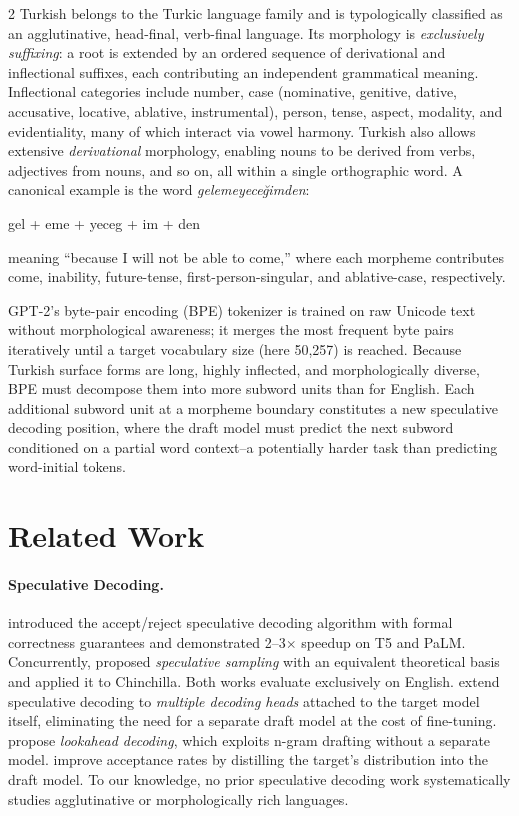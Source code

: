 \documentclass[11pt,a4paper]{article}
\begin{document}
\begin{multicols}{2}
Turkish belongs to the Turkic language family and is typologically
classified as an agglutinative, head-final, verb-final language.
Its morphology is \emph{exclusively suffixing}: a root is extended by
an ordered sequence of derivational and inflectional suffixes, each
contributing an independent grammatical meaning.
Inflectional categories include number, case (nominative, genitive,
dative, accusative, locative, ablative, instrumental), person, tense,
aspect, modality, and evidentiality, many of which interact via
vowel harmony.
Turkish also allows extensive \emph{derivational} morphology, enabling
nouns to be derived from verbs, adjectives from nouns, and so on, all
within a single orthographic word.
A canonical example is the word \textit{gelemeyeceğimden}:
\begin{center}
  \small gel + eme + yeceg + im + den
\end{center}
meaning ``because I will not be able to come,'' where each morpheme
contributes come, inability, future-tense, first-person-singular, and
ablative-case, respectively.

GPT-2's byte-pair encoding (BPE) tokenizer \citep{sennrich2016neural}
is trained on raw Unicode text without morphological awareness; it merges
the most frequent byte pairs iteratively until a target vocabulary size
(here 50,257) is reached.
Because Turkish surface forms are long, highly inflected, and
morphologically diverse, BPE must decompose them into more subword units
than for English.
Each additional subword unit at a morpheme boundary constitutes a new
speculative decoding position, where the draft model must predict the
next subword conditioned on a partial word context--a potentially harder
task than predicting word-initial tokens.

\section{Related Work}
\label{sec:related}

\paragraph{Speculative Decoding.}
\citet{leviathan2023fast} introduced the accept/reject speculative
decoding algorithm with formal correctness guarantees and demonstrated
2--3$\times$ speedup on T5 and PaLM.
Concurrently, \citet{chen2023accelerating} proposed \emph{speculative
sampling} with an equivalent theoretical basis and applied it to
Chinchilla.
Both works evaluate exclusively on English.
\citet{cai2024medusa} extend speculative decoding to \emph{multiple
decoding heads} attached to the target model itself, eliminating the need
for a separate draft model at the cost of fine-tuning.
\citet{fu2024break} propose \emph{lookahead decoding}, which exploits
n-gram drafting without a separate model.
\citet{zhou2024distillspec} improve acceptance rates by distilling the
target's distribution into the draft model.
To our knowledge, no prior speculative decoding work systematically studies
agglutinative or morphologically rich languages.


\end{multicols}
\end{document}
